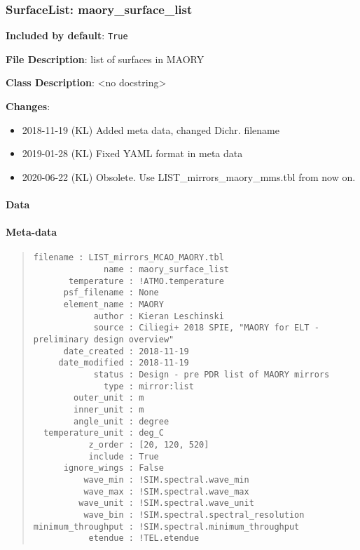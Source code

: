 \subsubsection{SurfaceList: \textquotedbl{}maory\_surface\_list\textquotedbl{}%
  \label{surfacelist-maory-surface-list}%
}

\textbf{Included by default}: \texttt{True}

\textbf{File Description}: list of surfaces in MAORY

\textbf{Class Description}: <no docstring>

\textbf{Changes}:

\begin{itemize}
\item 2018-11-19 (KL) Added meta data, changed Dichr. filename

\item 2019-01-28 (KL) Fixed YAML format in meta data

\item 2020-06-22 (KL) Obsolete. Use LIST\_mirrors\_maory\_mms.tbl from now on.
\end{itemize}


\paragraph{Data%
  \label{data}%
}


\paragraph{Meta-data%
  \label{meta-data}%
}

\begin{quote}
\begin{alltt}
\begin{lstlisting}[frame=single]
          filename : LIST_mirrors_MCAO_MAORY.tbl
              name : maory_surface_list
       temperature : !ATMO.temperature
      psf_filename : None
      element_name : MAORY
            author : Kieran Leschinski
            source : Ciliegi+ 2018 SPIE, "MAORY for ELT - preliminary design overview"
      date_created : 2018-11-19
     date_modified : 2018-11-19
            status : Design - pre PDR list of MAORY mirrors
              type : mirror:list
        outer_unit : m
        inner_unit : m
        angle_unit : degree
  temperature_unit : deg_C
           z_order : [20, 120, 520]
           include : True
      ignore_wings : False
          wave_min : !SIM.spectral.wave_min
          wave_max : !SIM.spectral.wave_max
         wave_unit : !SIM.spectral.wave_unit
          wave_bin : !SIM.spectral.spectral_resolution
minimum_throughput : !SIM.spectral.minimum_throughput
           etendue : !TEL.etendue
\end{lstlisting}
\end{alltt}
\end{quote}


